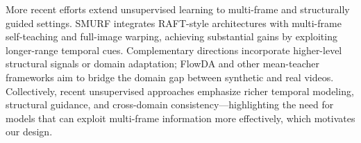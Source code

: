 More recent efforts extend unsupervised learning to multi-frame and structurally guided settings. SMURF \cite{smurf} integrates RAFT-style architectures with multi-frame self-teaching and full-image warping, achieving substantial gains by exploiting longer-range temporal cues. Complementary directions incorporate higher-level structural signals or domain adaptation; FlowDA \cite{flowda} and other mean-teacher frameworks aim to bridge the domain gap between synthetic and real videos. Collectively, recent unsupervised approaches emphasize richer temporal modeling, structural guidance, and cross-domain consistency—highlighting the need for models that can exploit multi-frame information more effectively, which motivates our design.


